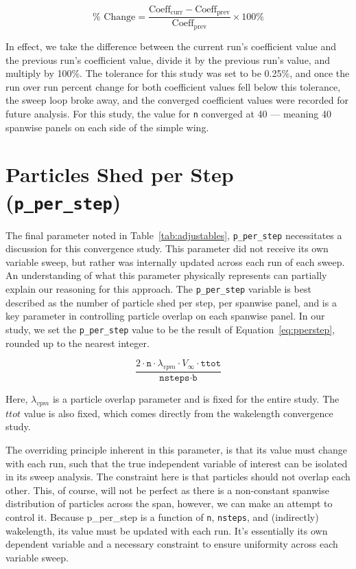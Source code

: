 \documentclass{report}
\begin{document}
\begin{equation}\label{eq:percent_change}
\% \text{ Change} = \frac{\text{Coeff}_{\text{curr}} - \text{Coeff}_{\text{prev}}}{\text{Coeff}_{\text{prev}}} \times{} 100\%
\end{equation}

In effect, we take the difference between the current run's coefficient value and the previous run's coefficient value, divide it by the previous run's value, and multiply by 100\%.
The tolerance for this study was set to be 0.25\%, and once the run over run percent change for both coefficient values fell below this tolerance, the sweep loop broke away, and the converged coefficient values were recorded for future analysis.
For this study, the value for \texttt{n} converged at 40 --- meaning 40 spanwise panels on each side of the simple wing.



\section{Particles Shed per Step (\texttt{p\_per\_step})}
The final parameter noted in Table~\ref{tab:adjustables}, \texttt{p\_per\_step} necessitates a discussion for this convergence study.
This parameter did not receive its own variable sweep, but rather was internally updated across each run of each sweep.
An understanding of what this parameter physically represents can partially explain our reasoning for this approach.
The \texttt{p\_per\_step} variable is best described as the number of particle shed per step, per spanwise panel, and is a key parameter in controlling particle overlap on each spanwise panel.
In our study, we set the \texttt{p\_per\_step} value to be the result of Equation~\ref{eq:pperstep}, rounded up to the nearest integer.

\begin{equation}\label{eq:pperstep}
\frac{2 \cdot \texttt{n} \cdot \lambda_{vpm} \cdot V_\infty \cdot \texttt{ttot}}{\texttt{nsteps} \cdot \texttt{b}}
\end{equation}

Here, $\lambda_{vpm}$ is a particle overlap parameter and is fixed for the entire study. The $ttot$ value is also fixed, which comes directly from the wakelength convergence study.

The overriding principle inherent in this parameter, is that its value must change with each run, such that the true independent variable of interest can be isolated in its sweep analysis.
The constraint here is that particles should not overlap each other. This, of course, will not be perfect as there is a non-constant spanwise distribution of particles across the span, however, we can make an attempt to control it. Because p\_per\_step is a function of \texttt{n}, \texttt{nsteps}, and (indirectly) wakelength, its value must be updated with each run.
It's essentially its own dependent variable and a necessary constraint to ensure uniformity across each variable sweep.
\end{document}
